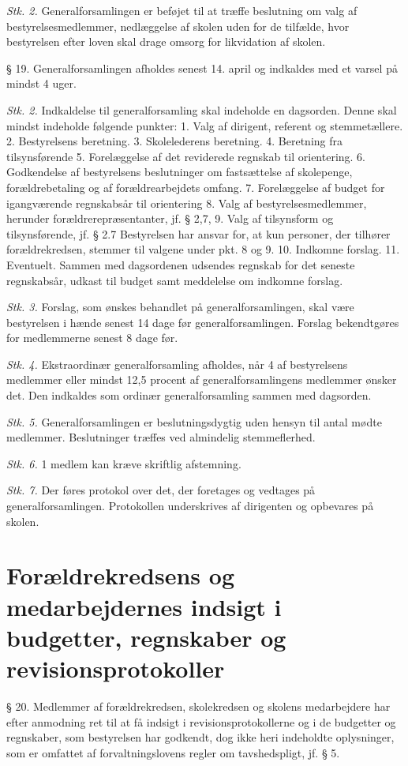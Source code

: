 \documentclass[11pt, a4paper]{article}
\begin{document}
\textit{Stk. 2.} Generalforsamlingen er beføjet til at træffe beslutning om valg af bestyrelsesmedlemmer, nedlæggelse af skolen uden for de tilfælde, hvor bestyrelsen efter loven skal drage omsorg for likvidation af skolen.

§ 19. Generalforsamlingen afholdes senest 14. april og indkaldes med et varsel på mindst 4 uger.

\textit{Stk. 2.} Indkaldelse til generalforsamling skal indeholde en dagsorden. Denne skal mindst indeholde følgende punkter:
1. Valg af dirigent, referent og stemmetællere.
2. Bestyrelsens beretning.
3. Skolelederens beretning.
4. Beretning fra tilsynsførende
5. Forelæggelse af det reviderede regnskab til orientering.
6. Godkendelse af bestyrelsens beslutninger om fastsættelse
af skolepenge, forældrebetaling og af forældrearbejdets omfang.
7. Forelæggelse af budget for igangværende regnskabsår til orientering
8. Valg af bestyrelsesmedlemmer, herunder forældrerepræsentanter, jf. § 2,7,
9. Valg af tilsynsform og tilsynsførende, jf. § 2.7
Bestyrelsen har ansvar for, at kun personer, der tilhører forældrekredsen, stemmer til valgene under pkt. 8 og 9.
10. Indkomne forslag.
11. Eventuelt.
Sammen med dagsordenen udsendes regnskab for det seneste regnskabsår, udkast til budget samt meddelelse om indkomne forslag.

\textit{Stk. 3.} Forslag, som ønskes behandlet på generalforsamlingen, skal være bestyrelsen i hænde senest 14 dage før generalforsamlingen. Forslag bekendtgøres for medlemmerne senest 8 dage før.

\textit{Stk. 4.} Ekstraordinær generalforsamling afholdes, når 4 af bestyrelsens medlemmer eller mindst 12,5 procent af generalforsamlingens medlemmer ønsker det. Den indkaldes som ordinær generalforsamling sammen med dagsorden.

\textit{Stk. 5.} Generalforsamlingen er beslutningsdygtig uden hensyn til antal mødte medlemmer. Beslutninger træffes ved almindelig stemmeflerhed.

\textit{Stk. 6.} 1 medlem kan kræve skriftlig afstemning.

\textit{Stk. 7.} Der føres protokol over det, der foretages og vedtages på generalforsamlingen. Protokollen underskrives af dirigenten og opbevares på skolen.

\section*{Forældrekredsens og medarbejdernes indsigt i budgetter, regnskaber og revisionsprotokoller}
§ 20. Medlemmer af forældrekredsen{, skolekredsen} og skolens medarbejdere har efter anmodning ret til at få indsigt i revisionsprotokollerne og i de budgetter og regnskaber, som bestyrelsen har godkendt, dog ikke heri indeholdte oplysninger, som er omfattet af forvaltningslovens regler om tavshedspligt, jf. § 5.
\end{document}
